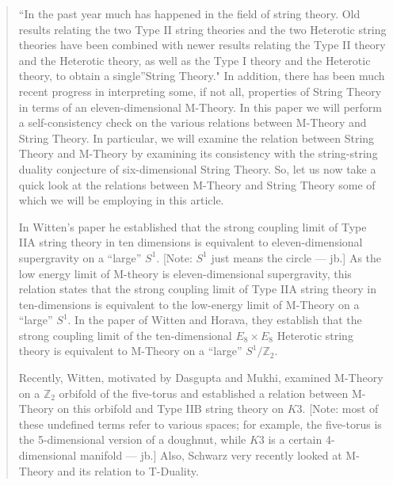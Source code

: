 \documentclass{article}
\begin{document}
\begin{quote}
``In the past year much has happened in the field of string theory. Old
results relating the two Type II string theories and the two Heterotic
string theories have been combined with newer results relating the Type
II theory and the Heterotic theory, as well as the Type I theory and the
Heterotic theory, to obtain a single''String Theory." In addition, there
has been much recent progress in interpreting some, if not all,
properties of String Theory in terms of an eleven-dimensional M-Theory.
In this paper we will perform a self-consistency check on the various
relations between M-Theory and String Theory. In particular, we will
examine the relation between String Theory and M-Theory by examining its
consistency with the string-string duality conjecture of six-dimensional
String Theory. So, let us now take a quick look at the relations between
M-Theory and String Theory some of which we will be employing in this
article.

In Witten's paper he established that the strong coupling limit of Type
IIA string theory in ten dimensions is equivalent to eleven-dimensional
supergravity on a ``large'' \(S^1\). {[}Note: \(S^1\) just means the
circle --- jb.{]} As the low energy limit of M-theory is
eleven-dimensional supergravity, this relation states that the strong
coupling limit of Type IIA string theory in ten-dimensions is equivalent
to the low-energy limit of M-Theory on a ``large'' \(S^1\). In the paper
of Witten and Horava, they establish that the strong coupling limit of
the ten-dimensional \(E_8 \times E_8\) Heterotic string theory is
equivalent to M-Theory on a ``large'' \(S^1/\mathbb{Z}_2\).

Recently, Witten, motivated by Dasgupta and Mukhi, examined M-Theory on
a \(\mathbb{Z}_2\) orbifold of the five-torus and established a relation
between M-Theory on this orbifold and Type IIB string theory on \(K3\).
{[}Note: most of these undefined terms refer to various spaces; for
example, the five-torus is the 5-dimensional version of a doughnut,
while \(K3\) is a certain 4-dimensional manifold --- jb.{]} Also,
Schwarz very recently looked at M-Theory and its relation to T-Duality.


\end{quote}
\end{document}
